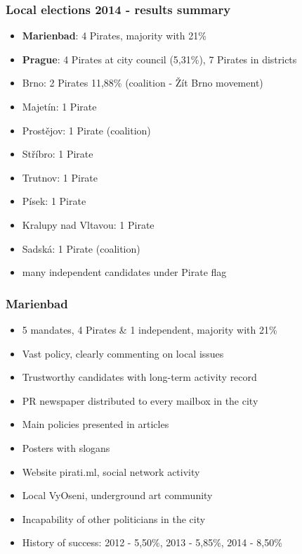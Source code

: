 \begin{frame}
	\frametitle{Local elections 2014 - results summary}
	\begin{itemize}
	\item \textbf{Marienbad}: 4 Pirates, majority with 21\%
	\item \textbf{Prague}: 4 Pirates at city council (5,31\%), 7 Pirates in districts
	\item Brno: 2 Pirates 11,88\% (coalition - \v{Z}\'it Brno movement)
	\item Majet\'in: 1 Pirate
	\item Prost\v{e}jov: 1 Pirate (coalition)
	\item St\v{r}\'ibro: 1 Pirate
	\item Trutnov: 1 Pirate
	\item P\'isek: 1 Pirate
	\item Kralupy nad Vltavou: 1 Pirate
	\item Sadsk\'a: 1 Pirate (coalition)
	\item many independent candidates under Pirate flag
\end{itemize}
\end{frame}
\begin{frame}
	\frametitle{Marienbad}
	\begin{itemize}
	\item 5 mandates, 4 Pirates \& 1 independent, majority with 21\%
	\item Vast policy, clearly commenting on local issues
	\item Trustworthy candidates with long-term activity record
	\item PR newspaper distributed to every mailbox in the city
	\item Main policies presented in articles
	\item Posters with slogans
	\item Website pirati.ml, social network activity
	\item Local VyOseni, underground art community
	\item Incapability of other politicians in the city
	\item History of success: 2012 - 5,50\%, 2013 - 5,85\%, 2014 - 8,50\%
	\end{itemize}
\end{frame}
